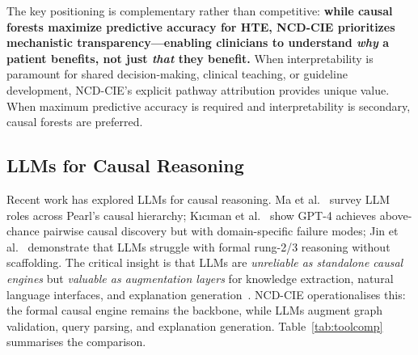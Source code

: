 \documentclass[runningheads]{llncs}
\begin{document}
The key positioning is complementary rather than competitive:
\textbf{while causal forests maximize predictive accuracy for HTE,
NCD-CIE prioritizes mechanistic transparency---enabling clinicians
to understand \emph{why} a patient benefits, not just \emph{that}
they benefit.}
When interpretability is paramount for shared decision-making,
clinical teaching, or guideline development, NCD-CIE's explicit
pathway attribution provides unique value.
When maximum predictive accuracy is required and interpretability
is secondary, causal forests are preferred.

\subsection{LLMs for Causal Reasoning}\label{sec:llmcausal}

Recent work has explored LLMs for causal reasoning.
Ma et al.~\cite{ma2024causal} survey LLM roles across Pearl's
causal hierarchy; K{\i}c{\i}man et al.~\cite{kiciman2023causal}
show GPT-4 achieves above-chance pairwise causal discovery but
with domain-specific failure modes; Jin et al.~\cite{jin2023cladder}
demonstrate that LLMs struggle with formal rung-2/3 reasoning
without scaffolding.
The critical insight is that LLMs are \emph{unreliable as standalone
causal engines} but \emph{valuable as augmentation layers} for
knowledge extraction, natural language interfaces, and explanation
generation~\cite{ma2024causal}.
NCD-CIE operationalises this: the formal causal engine remains
the backbone, while LLMs augment graph validation, query parsing,
and explanation generation.
Table~\ref{tab:toolcomp} summarises the comparison.
\end{document}
